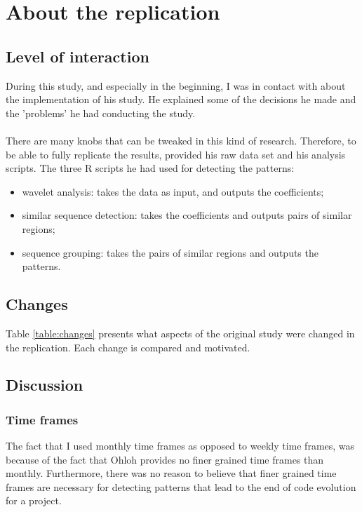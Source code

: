 \section{About the replication}
\subsection{Level of interaction}
During this study, and especially in the beginning, I was in contact with
\citeauthor{karus2013} about the implementation of his study. He explained some
of the decisions he made and the 'problems' he had conducting the study.

\paragraph{}
There are many knobs that can be tweaked in this kind of research. Therefore, to
be able to  fully replicate the results, \citeauthor{karus2013} provided his
raw data set and his analysis scripts. The three R scripts he had used for
detecting the patterns:
\begin{itemize}
	\item wavelet analysis: takes the data as input, and outputs
		the coefficients;

	\item similar sequence detection: takes the coefficients and
		outputs pairs of similar regions;

	\item sequence grouping: takes the pairs of similar regions and outputs the
		patterns.
\end{itemize}

\subsection{Changes}
Table \ref{table:changes} presents what aspects of the original study were
changed in the replication. Each change is compared and motivated.



\subsection{Discussion}
\subsubsection{Time frames}
The fact that I used monthly time frames as opposed to weekly time frames, was
because of the fact that Ohloh provides no finer grained time frames than
monthly. Furthermore, there was no reason to believe that finer grained time
frames are necessary for detecting patterns that lead to the end of code
evolution for a project.


